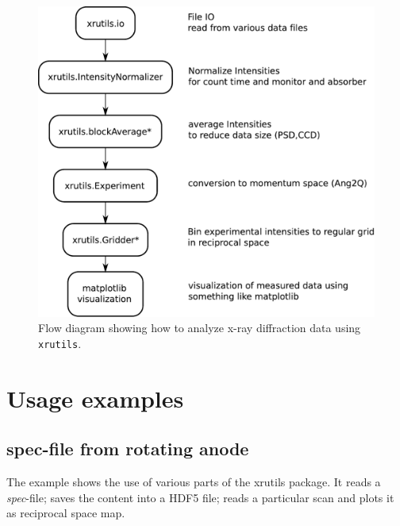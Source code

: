 \begin{figure}[H]
 \centering
 \includegraphics[width=0.8\linewidth]{pics/xrutils_usage}
 \caption{Flow diagram showing how to analyze x-ray diffraction data using {\tt xrutils}.}
 \label{fig:xrutils_usage}
\end{figure}

\section{Usage examples}

\subsection{spec-file from rotating anode}

The example shows the use of various parts of the xrutils package. It reads a \emph{spec}-file; saves the content into a HDF5 file; reads a particular scan and plots it as reciprocal space map.

